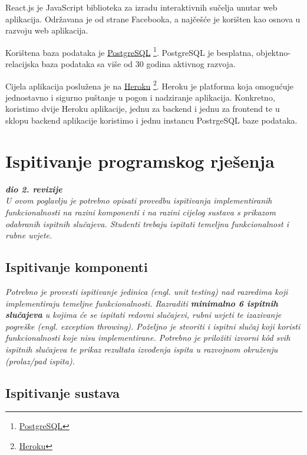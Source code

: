 			React.js je JavaScript biblioteka za izradu interaktivnih sučelja unutar web aplikacija. Održavana je od strane Facebooka, a najčešće je korišten kao osnova u razvoju web aplikacija.
			
			Korištena baza podataka je \underline{PostgreSQL} \footnote{\href{https://www.postgresql.org/}{PostgreSQL}}. PostgreSQL je besplatna, objektno-relacijska baza podataka sa više od 30 godina aktivnog razvoja.
			
			Cijela aplikacija poslužena je na \underline{Heroku} \footnote{\href{https://www.heroku.com/home}{Heroku}}. Heroku je platforma koja omogućuje jednostavno i sigurno puštanje  u pogon i nadziranje aplikacija. Konkretno, koristimo dvije Heroku aplikacije, jednu za backend i jednu za frontend te u sklopu backend aplikacije koristimo i jednu instancu PostrgeSQL baze podataka.
			
			\eject 
		
	
		\section{Ispitivanje programskog rješenja}
			
			\textbf{\textit{dio 2. revizije}}\\
			
			 \textit{U ovom poglavlju je potrebno opisati provedbu ispitivanja implementiranih funkcionalnosti na razini komponenti i na razini cijelog sustava s prikazom odabranih ispitnih slučajeva. Studenti trebaju ispitati temeljnu funkcionalnost i rubne uvjete.}
	
			
			\subsection{Ispitivanje komponenti}
			\textit{Potrebno je provesti ispitivanje jedinica (engl. unit testing) nad razredima koji implementiraju temeljne funkcionalnosti. Razraditi \textbf{minimalno 6 ispitnih slučajeva} u kojima će se ispitati redovni slučajevi, rubni uvjeti te izazivanje pogreške (engl. exception throwing). Poželjno je stvoriti i ispitni slučaj koji koristi funkcionalnosti koje nisu implementirane. Potrebno je priložiti izvorni kôd svih ispitnih slučajeva te prikaz rezultata izvođenja ispita u razvojnom okruženju (prolaz/pad ispita). }
			
			
			
			\subsection{Ispitivanje sustava}
			
